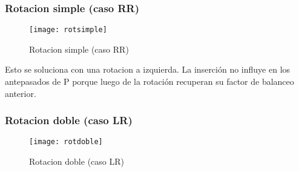 \documentclass[10pt,a4paper]{article}
\begin{document}
\subsubsection{Rotacion simple (caso RR)}

\begin{figure}[h]
	\centering
	\texttt{[image: rotsimple]}
	\caption{Rotacion simple (caso RR)}
	\label{drivers1}
\end{figure}

Esto se soluciona con una rotacion a izquierda.
\newline
\newline
La inserción no influye en los antepasados de P porque luego de la rotación recuperan su factor de balanceo anterior.

\subsubsection{Rotacion doble (caso LR)}

\begin{figure}[h]
	\centering
	\texttt{[image: rotdoble]}
	\caption{Rotacion doble (caso LR)}
	\label{drivers1}
\end{figure}
\end{document}
